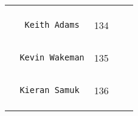 \documentclass[]{article}
\begin{document}
\begin{longtable}[c]{@{}llll@{}}
\begin{minipage}[t]{0.13\columnwidth}
\end{minipage} & \begin{minipage}[t]{0.15\columnwidth}\raggedright
\end{minipage}
\\\noalign{\medskip}
\begin{minipage}[t]{0.39\columnwidth}\raggedright
\begin{verbatim}
   Keith Adams
\end{verbatim}
\end{minipage} & \begin{minipage}[t]{0.10\columnwidth}\raggedright
134
\end{minipage} & \begin{minipage}[t]{0.13\columnwidth}\raggedright
\end{minipage} & \begin{minipage}[t]{0.15\columnwidth}\raggedright
\end{minipage}
\\\noalign{\medskip}
\begin{minipage}[t]{0.39\columnwidth}\raggedright
\begin{verbatim}
  Kevin Wakeman
\end{verbatim}
\end{minipage} & \begin{minipage}[t]{0.10\columnwidth}\raggedright
135
\end{minipage} & \begin{minipage}[t]{0.13\columnwidth}\raggedright
\end{minipage} & \begin{minipage}[t]{0.15\columnwidth}\raggedright
\end{minipage}
\\\noalign{\medskip}
\begin{minipage}[t]{0.39\columnwidth}\raggedright
\begin{verbatim}
  Kieran Samuk
\end{verbatim}
\end{minipage} & \begin{minipage}[t]{0.10\columnwidth}\raggedright
136
\end{minipage} & \begin{minipage}[t]{0.13\columnwidth}\raggedright
\end{minipage} & \begin{minipage}[t]{0.15\columnwidth}\raggedright
\end{minipage}
\\\noalign{\medskip}
\begin{minipage}[t]{0.39\columnwidth}\raggedright

\end{minipage}
\end{longtable}
\end{document}
